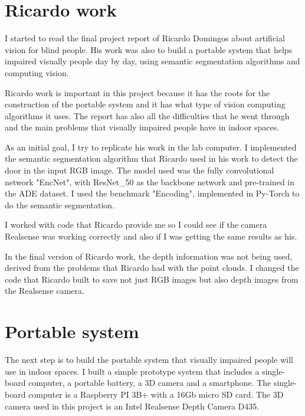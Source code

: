     
    \section{Ricardo work}
    
    I started to read the final project report of Ricardo Domingos about artificial vision for blind people. His work was also to build a portable system that helps impaired visually people day by day, using semantic segmentation algorithms and computing vision. 
    
    Ricardo work is important in this project because it has the roots for the construction of the portable system and it has what type of vision computing algorithms it uses. The report has also all the difficulties that he went through and the main problems that visually impaired people have in indoor spaces.
    
    As an initial goal, I try to replicate his work in the lab computer.
    I implemented the semantic segmentation algorithm that Ricardo used in his work to detect the door in the input RGB image. The model used was the fully convolutional network "EncNet", with ResNet\_50 as the backbone network and pre-trained in the ADE dataset. I used the benchmark "Encoding", implemented in Py-Torch to do the semantic segmentation.
    
    I worked with code that Ricardo provide me so I could see if the camera Realsense was working correctly and also if I was getting the same results as his.
    
    In the final version of Ricardo work, the depth information was not being used, derived from the problems that Ricardo had with the point clouds. I changed the code that Ricardo built to save not just RGB images but also depth images from the Realsense camera.
    
    
    
    
    
    
    \section{Portable system}
    
    The next step is to build the portable system that visually impaired people will use in indoor spaces. I built a simple prototype system that includes a single-board computer, a portable battery, a 3D camera and a smartphone. The single-board computer is a Raspberry PI 3B+ with a 16Gb micro SD card. The 3D camera used in this project is an Intel Realsense Depth Camera D435.
    
